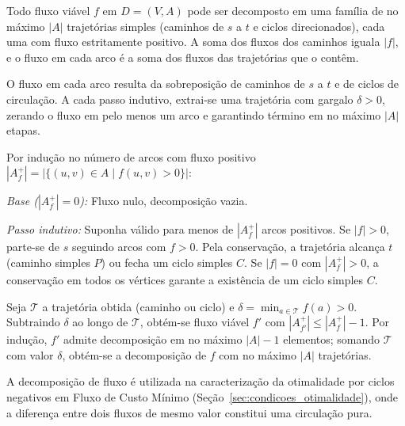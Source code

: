 \begin{teorema}
Todo fluxo viável $f$ em $D = (V, A)$ pode ser decomposto em uma família de no máximo $|A|$ trajetórias simples (caminhos de $s$ a $t$ e ciclos direcionados), cada uma com fluxo estritamente positivo. A soma dos fluxos dos caminhos iguala $|f|$, e o fluxo em cada arco é a soma dos fluxos das trajetórias que o contêm.
\end{teorema}

 O fluxo em cada arco resulta da sobreposição de caminhos de $s$ a $t$ e de ciclos de circulação. A cada passo indutivo, extrai-se uma trajetória com gargalo $\delta > 0$, zerando o fluxo em pelo menos um arco e garantindo término em no máximo $|A|$ etapas.

\begin{demonstracao}
Por indução no número de arcos com fluxo positivo $|A_f^+| = |\{(u,v) \in A \mid f(u,v) > 0\}|$:

\medskip
\noindent \textit{Base ($|A_f^+| = 0$):} Fluxo nulo, decomposição vazia.

\medskip
\noindent \textit{Passo indutivo:} Suponha válido para menos de $|A_f^+|$ arcos positivos. Se $|f| > 0$, parte-se de $s$ seguindo arcos com $f > 0$. Pela conservação, a trajetória alcança $t$ (caminho simples $P$) ou fecha um ciclo simples $C$. Se $|f| = 0$ com $|A_f^+| > 0$, a conservação em todos os vértices garante a existência de um ciclo simples $C$.

Seja $\mathcal{T}$ a trajetória obtida (caminho ou ciclo) e $\delta = \min_{a \in \mathcal{T}} f(a) > 0$. Subtraindo $\delta$ ao longo de $\mathcal{T}$, obtém-se fluxo viável $f'$ com $|A_{f'}^+| \le |A_f^+| - 1$. Por indução, $f'$ admite decomposição em no máximo $|A| - 1$ elementos; somando $\mathcal{T}$ com valor $\delta$, obtém-se a decomposição de $f$ com no máximo $|A|$ trajetórias.
\end{demonstracao}

A decomposição de fluxo é utilizada na caracterização da otimalidade por ciclos negativos em Fluxo de Custo Mínimo (Seção~\ref{sec:condicoes_otimalidade}), onde a diferença entre dois fluxos de mesmo valor constitui uma circulação pura.

